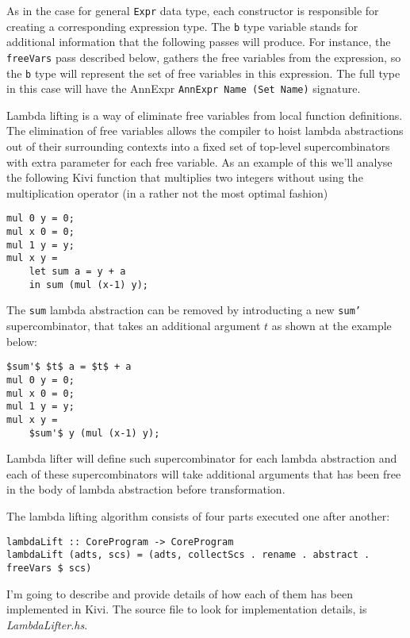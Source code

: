 \documentclass[a4paper]{report}
\begin{document}
As in the case for general \texttt{Expr} data type, each constructor is
responsible for creating a corresponding expression type. The \texttt{b} type
variable stands for additional information that the following passes will
produce. For instance, the \texttt{freeVars} pass described below, gathers the
free variables from the expression, so the \texttt{b} type will represent the
set of free variables in this expression. The full type in this case will have
the AnnExpr \texttt{AnnExpr Name (Set Name)} signature.

Lambda lifting is a way of eliminate free variables from local function
definitions. The elimination of free variables allows the compiler to hoist
lambda abstractions out of their surrounding contexts into a fixed set of
top-level supercombinators with extra parameter for each free variable. As an
example of this we'll analyse the following Kivi function that multiplies two
integers without using the multiplication operator (in a rather not the most
optimal fashion)

\begin{lstlisting}
mul 0 y = 0;
mul x 0 = 0;
mul 1 y = y;
mul x y =
    let sum a = y + a
    in sum (mul (x-1) y);
\end{lstlisting}

The \texttt{sum} lambda abstraction can be removed by introducting a new
\texttt{sum'} supercombinator, that takes an additional argument $t$ as shown at
the example below:

\begin{lstlisting}[mathescape=true]
$sum'$ $t$ a = $t$ + a
mul 0 y = 0;
mul x 0 = 0;
mul 1 y = y;
mul x y =
    $sum'$ y (mul (x-1) y);
\end{lstlisting}

Lambda lifter will define such supercombinator for each lambda abstraction and
each of these supercombinators will take additional arguments that has been
free in the body of lambda abstraction before transformation.

The lambda lifting algorithm consists of four parts executed one after another:

\begin{lstlisting}
lambdaLift :: CoreProgram -> CoreProgram
lambdaLift (adts, scs) = (adts, collectScs . rename . abstract . freeVars $ scs)
\end{lstlisting}

I'm going to describe and provide details of how each of them has been
implemented in Kivi. The source file to look for implementation details, is
\textit{LambdaLifter.hs}.
\end{document}
